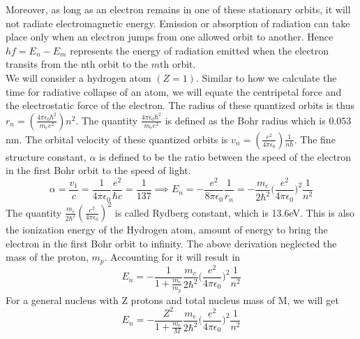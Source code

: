\documentclass[a4paper]{article}
\begin{document}
\begin{Note}
Moreover, as long as an electron remains in one of these stationary orbits, it will not radiate electromagnetic energy. Emission or absorption of radiation can take place only when an electron jumps from one allowed orbit to another. Hence $hf=E_n-E_m$ represents the energy of radiation emitted when the electron transits from the nth orbit to the $m$th orbit.\\[5pt]
We will consider a hydrogen atom $(Z=1)$. Similar to how we calculate the time for radiative collapse of an atom, we will equate the centripetal force and the electrostatic force of the electron. The radius of these quantized orbits is thus  $r_n=(\frac{4\pi\epsilon_0\hbar^2}{m_ee^2})n^2$. 
The quantity $\frac{4\pi\epsilon_0\hbar^2}{m_ee^2}$ is defined as the Bohr radius which is $0.053$ nm. The orbital velocity of these quantized orbits is $
v_n=(\frac{e^2}{4\pi\epsilon_0})\frac{1}{n\hbar}$. 
The fine structure constant, $\alpha$ is defined to be the ratio between the speed of the electron in the first Bohr orbit to the speed of light.
$$\alpha=\frac{v_1}{c}=\frac{1}{4\pi\epsilon_0}\frac{e^2}{\hbar c}=\frac{1}{137}\implies E_n=-\frac{e^2}{8\pi\epsilon_0}\frac{1}{r_n}=-\frac{m_e}{2\hbar^2}\bigg(\frac{e^2}{4\pi\epsilon_0}\bigg)^2\frac{1}{n^2}$$
The quantity $\frac{m_e}{2\hbar^2}(\frac{e^2}{4\pi\epsilon_0})^2$ is called Rydberg constant, which is 13.6eV. This is also the ionization energy of the Hydrogen atom, amount of energy to bring the electron in the first Bohr orbit to infinity. The above derivation neglected the mass of the proton, $m_p$. Accounting for it will result in 
$$E_n=-\frac{1}{1+\frac{m_e}{m_p}}\frac{m_e}{2\hbar^2}\bigg(\frac{e^2}{4\pi\epsilon_0}\bigg)^2\frac{1}{n^2}$$
For a general nucleus with Z protons and total nucleus mass of M, we will get
$$E_n=-\frac{Z^2}{1+\frac{m_e}{M}}\frac{m_e}{2\hbar^2}\bigg(\frac{e^2}{4\pi\epsilon_0}\bigg)^2\frac{1}{n^2}$$
\end{Note}
\newpage
\end{document}

